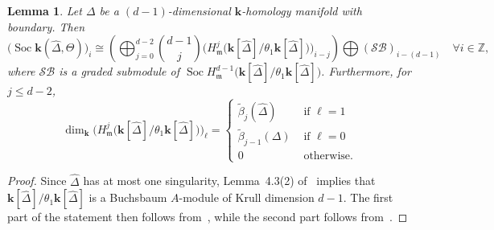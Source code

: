 \documentclass[10pt]{amsart}
\newtheorem{lemma}[theorem]{Lemma}
\theoremstyle{definition}
\DeclareMathOperator{\Soc}{Soc}
\newcommand{\complet}[1]{\hat{#1}}
\newcommand{\SB}{\mathcal{SB}}
\newcommand{\field}{\mathbf{k}}
\newcommand{\Z}{{\mathbb Z}}
\newcommand{\mideal}{\ensuremath{\mathfrak{m}}}
\begin{document}
\begin{lemma} \label{mod-theta1-decompos}
Let $\Delta$ be a $(d-1)$-dimensional $\field$-homology manifold with boundary. Then 
\[
\big(\Soc\field(\complet{\Delta},\Theta)\big)_i\cong \left(\bigoplus_{j=0}^{d-2}\binom{d-1}{j}\big(H^j_\mideal\big(\field[\complet{\Delta}]/\theta_1\field[\complet{\Delta}]\big)\big)_{i-j}\right)\bigoplus (\SB)_{i-(d-1)} \quad \forall i\in\Z,
\]
where $\SB$ is a graded submodule of $\Soc H^{d-1}_\mideal\big(\field[\complet{\Delta}]/\theta_1\field[\complet{\Delta}]\big)$.
Furthermore, for $j\leq d-2$,
\[
\dim_\field \big(H^j_\mideal\big(\field[\complet{\Delta}]/\theta_1\field[\complet{\Delta}]\big)\big)_\ell=
\begin{cases}
\tilde{\beta}_j(\complet{\Delta}) & \mbox{ if $\ell=1$}\\
\tilde{\beta}_{j-1}(\Delta) & \mbox{ if $\ell=0$}\\
0 & \mbox{ otherwise}.
\end{cases}
\]
\end{lemma}
\begin{proof} 
Since $\complet{\Delta}$ has at most one singularity, Lemma~4.3(2) of~\cite{Novik-Swartz-12} implies that $\field[\complet{\Delta}]/\theta_1\field[\complet{\Delta}]$ is a Buchsbaum $A$-module of Krull dimension $d-1$. The first part of the statement then follows from~\cite[Theorem~2.2]{Novik-Swartz-09:Socles}, while the second part follows from~\cite[Lemma~4.3(1) and Theorem~4.7]{Novik-Swartz-12}.
\end{proof}
\end{document}
